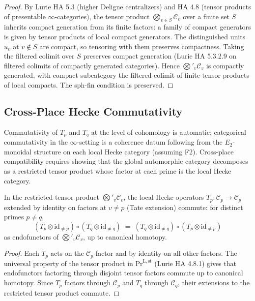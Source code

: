 \begin{proof}
By Lurie HA 5.3 (higher Deligne centralizers) and HA 4.8 (tensor
products of presentable \(\infty\)-categories), the tensor product
\(\bigotimes_{v\in S}\mathcal{C}_{v}\) over a finite set \(S\) inherits
compact generation from its finite factors: a family of compact
generators is given by tensor products of local compact generators.
The distinguished units \(u_{v}\) at \(v\notin S\) are compact, so
tensoring with them preserves compactness. Taking the filtered
colimit over \(S\) preserves compact generation (Lurie HA 5.3.2.9 on
filtered colimits of compactly generated categories). Hence
\(\bigotimes'_{v}\mathcal{C}_{v}\) is compactly generated, with
compact subcategory the filtered colimit of finite tensor products
of local compacts. The sph-fin condition is preserved.
\end{proof}

\subsection{Cross-Place Hecke Commutativity}
\label{v4-arith:acd:obstruction-4}

Commutativity of \(T_{p}\) and \(T_{q}\) at the level of cohomology is
automatic; categorical commutativity in the \(\infty\)-setting is a
coherence datum following from the \(E_{2}\)-monoidal structure on
each local Hecke category (assuming F2). Cross-place compatibility
requires showing that the global automorphic category decomposes as a
restricted tensor product whose factor at each prime is the local Hecke
category.

\begin{proposition}
\label{v4-arith:acd:prop:cross-place-commutativity}
In the restricted tensor product
\(\bigotimes'_{v}\mathcal{C}_{v}\), the local Hecke operators
\(T_{p}:\mathcal{C}_{p}\to\mathcal{C}_{p}\) extended by identity on
factors at \(v\neq p\) (Tate extension) commute: for distinct primes
\(p\neq q\),
\begin{equation}
(T_{p}\otimes\mathrm{id}_{\neq p})\circ(T_{q}\otimes\mathrm{id}_{\neq q})\;=\;(T_{q}\otimes\mathrm{id}_{\neq q})\circ(T_{p}\otimes\mathrm{id}_{\neq p})
\end{equation}
as endofunctors of \(\bigotimes'_{v}\mathcal{C}_{v}\), up to canonical
homotopy.
\end{proposition}

\begin{proof}
Each \(T_{p}\) acts on the \(\mathcal{C}_{p}\)-factor and by identity on
all other factors. The universal property of the tensor product in
\(\mathrm{Pr}^{\mathrm{L,st}}\) (Lurie HA 4.8.1) gives that
endofunctors factoring through disjoint tensor factors commute up
to canonical homotopy. Since \(T_{p}\) factors through \(\mathcal{C}_{p}\)
and \(T_{q}\) through \(\mathcal{C}_{q}\), their extensions to the
restricted tensor product commute.
\end{proof}

